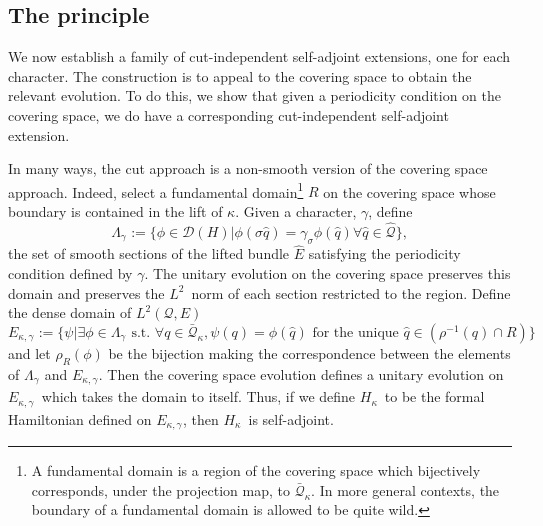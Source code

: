 \documentclass[11pt]{article}
\theoremstyle{remark}
\begin{document}
\subsection{The principle}

We now establish a family of cut-independent self-adjoint extensions,
one for each character. The construction is to appeal to the covering
space to obtain the relevant evolution.  
To do this, we  show that given a periodicity
condition on the covering space, we do have a corresponding
cut-independent self-adjoint extension.

In many ways, the cut approach is a non-smooth version of the
covering space approach. 
Indeed, select a fundamental domain\footnote{A fundamental domain is a
region of the covering space which bijectively corresponds, under the
projection map, to \ensuremath{\bar{\ensuremath{\mathcal{Q}}}_{\ensuremath{\kappa}}}. In more general contexts, the boundary of
a fundamental domain is allowed to be quite wild.} $R$ on the covering space
whose boundary is contained in the lift of \ensuremath{\kappa}. 
Given a character, \ensuremath{\gamma},
define
\[\Lambda_{\ensuremath{\gamma_{}}} \ensuremath{:=} \{\phi \in \ensuremath{\mathcal{D}}(H)
| \phi(\sigma
\ensuremath{\hat{q}}) = \ensuremath{\gamma_{\ensuremath{\sigma}}} \phi(\ensuremath{\hat{q}}) \forall \ensuremath{\hat{q}} \in \ensuremath{\widehat{\ensuremath{\mathcal{Q}}}}\},
\]
the set of smooth sections of the lifted bundle
$\ensuremath{\widehat{E}}$ satisfying the periodicity condition defined by \ensuremath{\gamma}. 
The unitary evolution on the covering space preserves this
domain and preserves the \ensuremath{L^{2}}\ norm of each section restricted to the
region. Define the dense domain of $\ensuremath{L^{2}}(\ensuremath{\mathcal{Q}}, E)$
\[
\ensuremath{E_{\ensuremath{\kappa}, \ensuremath{\gamma_{}}}}  \ensuremath{:=}
\{\ensuremath{\psi} | \exists \phi \in \Lambda_{\ensuremath{\gamma_{}}} \text{ s.t. }
 \forall \ensuremath{q} \in \ensuremath{\bar{\ensuremath{\mathcal{Q}}}_{\ensuremath{\kappa}}},  \ensuremath{\psi}(\ensuremath{q}) = \phi(\ensuremath{\hat{q}})  \text{ for
the unique } \ensuremath{\hat{q}} \in (\ensuremath{\ensuremath{\rho}}^{-1} (\ensuremath{q}) \cap R)\}
\]
and let $\ensuremath{\ensuremath{\rho}}_R(\phi)$ be the bijection making the correspondence between
the elements of $\Lambda_{\ensuremath{\gamma_{}}}$ and \ensuremath{E_{\ensuremath{\kappa}, \ensuremath{\gamma_{}}}}.
Then the covering space evolution defines a unitary evolution on
\ensuremath{E_{\ensuremath{\kappa}, \ensuremath{\gamma_{}}}}\ which takes the domain to itself. 
Thus, if we define \ensuremath{H_{\ensuremath{\kappa}}}\ to be the formal Hamiltonian defined on
\ensuremath{E_{\ensuremath{\kappa}, \ensuremath{\gamma_{}}}},  then \ensuremath{H_{\ensuremath{\kappa}}}\ is self-adjoint. 
\end{document}
